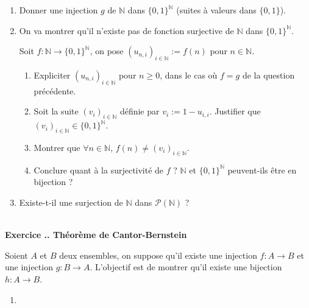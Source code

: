 \documentclass{article}
\newcommand{\mb}[1]{\mathbb{#1}}
\newcommand{\mc}[1]{\mathcal{#1}}
\newcounter{exo}
\newcommand{\exercice}[1][\null]{\textbf{\\ Exercice \thesection.\theexo. #1} \addtocounter{exo}{1}}
\begin{document}
\begin{enumerate}

\item Donner une injection $g$ de $\mb{N}$ dans $\{0,1\}^{\mb{N}}$ (suites à valeurs dans $\{0,1\}$).

\item On va montrer qu'il n'existe pas de fonction surjective de $\mb{N}$ dans $\{0,1\}^{\mb{N}}$.

Soit $f : \mb{N} \rightarrow \{0,1\}^{\mb{N}}$, on pose $(u_{n,i})_{i \in \mb{N}} := f(n)$ pour $n \in \mb{N}$.

\begin{enumerate}

\item Expliciter $(u_{n,i})_{i \in \mb{N}}$ pour $n \ge 0$, dans le cas où $f = g$ de la question précédente.

\item Soit la suite $(v_i)_{i \in \mb{N}}$ définie par $v_i := 1 - u_{i,i}$. Justifier que $(v_i)_{i \in \mb{N}} \in \{0,1\}^{\mb{N}}$. 

\item Montrer que $\forall n \in \mb{N}$, $ f(n)\neq (v_i )_{i \in \mb{N}}$.

\item Conclure quant à la surjectivité de $f$ ? $\mb{N}$ et $\{0,1\}^{\mb{N}}$ peuvent-ils être en bijection ?

\end{enumerate}

\item Existe-t-il une surjection de $\mb{N}$ dans $\mc{P}(\mb{N})$ ?

\end{enumerate}





\exercice[Théorème de Cantor-Bernstein]

Soient $A$ et $B$ deux ensembles, on suppose qu'il existe une injection $f : A \rightarrow B$ et une injection $g : B \rightarrow A$. L'objectif est de montrer qu'il existe une bijection $h : A \rightarrow B$.

\begin{enumerate}

\item 

\end{enumerate}
\end{document}
